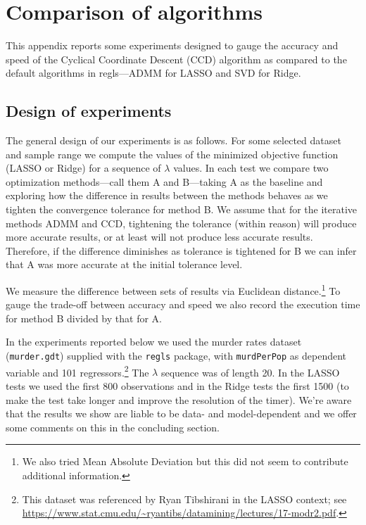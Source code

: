 \documentclass{article}
\newcommand{\startappendices}{%
\newcounter{appcount}
\setcounter{appcount}{0}
\renewcommand{\thesection}{Appendix \Alph{appcount}}}
\newcommand{\myappendix}[1]{%
\addtocounter{appcount}{1}
\section{#1}}
\begin{document}



\clearpage
\startappendices

\myappendix{Comparison of algorithms}
\label{app:ccd}

This appendix reports some experiments designed to gauge the accuracy
and speed of the Cyclical Coordinate Descent (CCD) algorithm as
compared to the default algorithms in \textsf{regls}---ADMM for LASSO
and SVD for Ridge.

\subsection*{Design of experiments}

The general design of our experiments is as follows. For some selected
dataset and sample range we compute the values of the minimized
objective function (LASSO or Ridge) for a sequence of $\lambda$
values. In each test we compare two optimization methods---call them A
and B---taking A as the baseline and exploring how the difference in
results between the methods behaves as we tighten the convergence
tolerance for method B. We assume that for the iterative methods ADMM
and CCD, tightening the tolerance (within reason) will produce more
accurate results, or at least will not produce less accurate
results. Therefore, if the difference diminishes as tolerance is
tightened for B we can infer that A was more accurate at the initial
tolerance level.

We measure the difference between sets of results via Euclidean
distance.\footnote{We also tried Mean Absolute Deviation but this did
  not seem to contribute additional information.}  To gauge the
trade-off between accuracy and speed we also record the execution time
for method B divided by that for A.

In the experiments reported below we used the murder rates dataset
(\texttt{murder.gdt}) supplied with the \texttt{regls} package, with
\texttt{murdPerPop} as dependent variable and 101
regressors.\footnote{This dataset was referenced by Ryan Tibshirani in
  the LASSO context; see
  \url{https://www.stat.cmu.edu/~ryantibs/datamining/lectures/17-modr2.pdf}.}
The $\lambda$ sequence was of length 20. In the LASSO tests we used
the first 800 observations and in the Ridge tests the first 1500 (to
make the test take longer and improve the resolution of the
timer). We're aware that the results we show are liable to be data-
and model-dependent and we offer some comments on this in the
concluding section.
\end{document}
